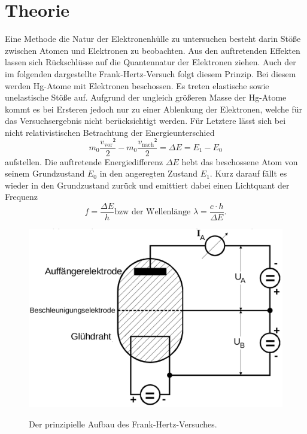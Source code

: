 
\section{Theorie}
\label{sec:Theorie}
Eine Methode die Natur der Elektronenhülle zu untersuchen besteht darin Stöße zwischen
Atomen und Elektronen zu beobachten.
Aus den auftretenden Effekten lassen sich Rückschlüsse auf die Quantennatur der Elektronen ziehen.
Auch der im folgenden dargestellte Frank-Hertz-Versuch folgt diesem Prinzip.
Bei diesem werden Hg-Atome mit Elektronen beschossen. Es treten elastische sowie unelastische Stöße auf.
Aufgrund der ungleich größeren Masse der Hg-Atome kommt es bei Ersteren jedoch nur
zu einer Ablenkung der Elektronen, welche für das Versuchsergebnis nicht berücksichtigt werden.
Für Letztere lässt sich bei nicht relativistischen Betrachtung der Energieunterschied
\begin{equation}
  m_0 \frac{v_\text{vor}²}{2} - m_0 \frac{v_\text{nach}²}{2} = \Delta E = E_1 - E_0\label{eq:Estoss}
  \end{equation}
  aufstellen.
Die auftretende Energiedifferenz $\Delta E$ hebt das beschossene
Atom von seinem Grundzustand $E_0$ in den angeregten Zustand $E_1$. Kurz
darauf fällt es wieder in den Grundzustand zurück und emittiert dabei einen Lichtquant der Frequenz
\begin{equation}
  f = \frac{\Delta E}{h} \text{bzw der Wellenlänge } \lambda = \frac{c \cdot h}{\Delta E}\text{.}\label{eq:f}
  \end{equation}

  \begin{figure}
 \centering
 \caption{Der prinzipielle Aufbau des Frank-Hertz-Versuches.}
 \includegraphics[width=\linewidth-170pt,height=\textheight-170pt,keepaspectratio]{content/franktheorie.png}
 \label{fig:franktheorie}
\end{figure}

